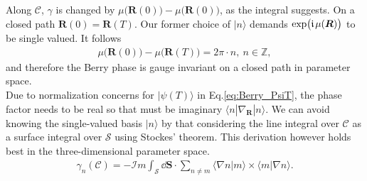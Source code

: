 \documentclass[../main]{subfiles}
\begin{document}
    Along $\mathcal{C}$, $\gamma$ is changed by $\mu\bigl(\bm{R}(0)\bigr) - \mu\bigl(\bm{R}(0)\bigr) $, as the integral suggests. On a closed path $\bm{R}(0) = \bm{R}(T)$.
     Our former choice of $|n\rangle$ demands $ \exp\bigl(\large\mathfrak{i}\hspace*{1.3pt}\normalsize \mu(\bm{R})\bigr)$ to be single valued. It follows 
    \begin{align*}
        \mu\bigl(\bm{R}(0)\bigr) - \mu\bigl(\bm{R}(T)\bigr) = 2\pi \cdot n, ~ n\in \mathbb{Z},
    \end{align*}
    and therefore the Berry phase is gauge invariant on a closed path in parameter space.\\

    Due to normalization concerns for $|\psi(T)\rangle$ in Eq.\ref{eq:Berry_PsiT}, the phase factor needs to be real  so that must be imaginary $\langle n | \nabla_{\bm{R}} | n \rangle$.
    We can avoid knowing the single-valued basis $|n\rangle$ by that considering the line integral over $\mathcal{C}$ 
    as a surface integral over $\mathcal{S}$ using Stockes' theorem. This derivation however holds best
    in the three-dimensional parameter space.
    \begin{align*}
        \gamma_n(\mathcal{C}) = -\mathcal{I}m \int_{\mathcal{S}} \dd \bm{S} \cdot \sum_{n\neq m} \langle\nabla n|m\rangle\times \langle m | \nabla n\rangle.
    \end{align*}
\end{document}
